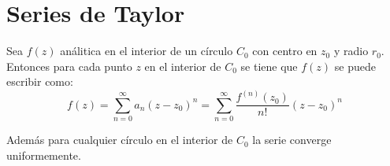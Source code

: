 \documentclass[12pt, fleqn]{report}                             %
\begin{document}
            
                
                

        \clearpage
        \section{Series de Taylor}

            Sea $f(z)$ análitica en el interior de un círculo $C_0$ con centro en $z_0$
            y radio $r_0$. Entonces para cada punto $z$ en el interior de $C_0$ se tiene
            que $f(z)$ se puede escribir como:
            \begin{equation*}
                f(z)    
                    = \sum_{n=0}^\infty a_n (z-z_0)^n
                    = \sum_{n=0}^\infty \dfrac{f^{(n)}(z_0)}{n!} (z-z_0)^n
            \end{equation*}

            Además para cualquier círculo en el interior de $C_0$ la serie converge
            uniformemente.
\end{document}
